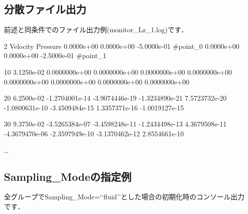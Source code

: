 \subsection{分散ファイル出力}
前述と同条件でのファイル出力例(monitor\_Lz\_1.log)です．

{\small
\begin{program}
2 Velocity Pressure 
  0.0000e+00   0.0000e+00  -5.0000e-01  #point_0
  0.0000e+00   0.0000e+00  -2.5000e-01  #point_1

10   3.1250e-02
  0.0000000e+00   0.0000000e+00   0.0000000e+00   0.0000000e+00 
  0.0000000e+00   0.0000000e+00   0.0000000e+00   0.0000000e+00 

20   6.2500e-02
 -1.2704001e-14  -3.9074446e-19  -1.3234890e-21   7.5723732e-20 
 -1.0800631e-10  -3.4509484e-15   1.3357371e-16  -1.0019127e-15 

30   9.3750e-02
 -3.5265384e-07  -3.4598248e-11  -1.2434498e-13   4.3679508e-11 
 -4.3679470e-06  -2.3597949e-10  -3.1370462e-12   2.8554661e-10

…
\end{program}
}

\pagebreak
\subsection{Sampling\_Modeの指定例}
全グループでSampling\_Mode=\lq\lq fluid\rq\rq とした場合の初期化時のコンソール出力です．

